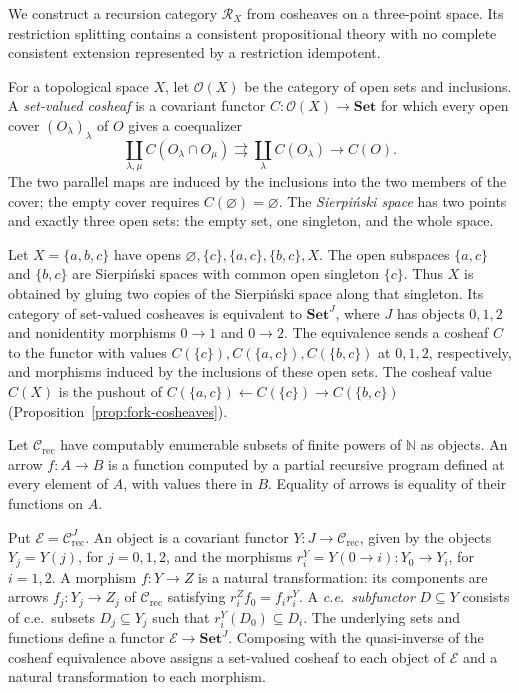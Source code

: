 \documentclass[11pt]{article}
\newcommand{\N}{\mathbb N}
\begin{document}
We construct a recursion category $\mathscr R_X$ from cosheaves on a
three-point space. Its restriction splitting contains a consistent
propositional theory with no complete consistent extension represented
by a restriction idempotent.

For a topological space $X$, let $\mathcal O(X)$ be the category
of open sets and inclusions. A \emph{set-valued cosheaf} is a
covariant functor $C:\mathcal O(X)\to\mathbf{Set}$ for which
every open cover $(O_\lambda)_\lambda$ of $O$ gives a coequalizer
\cite[Definition 2.6]{CurryCosheaves}
\[
 \coprod_{\lambda,\mu} C(O_\lambda\cap O_\mu)
 \rightrightarrows \coprod_\lambda C(O_\lambda)
 \longrightarrow C(O).
\]
The two parallel maps are induced by the inclusions into the two
members of the cover; the empty cover requires
$C(\varnothing)=\varnothing$.
The \emph{Sierpi\'nski space} has two points and exactly three open
sets: the empty set, one singleton, and the whole space.

Let $X=\{a,b,c\}$ have opens
$\varnothing,\{c\},\{a,c\},\{b,c\},X$.
The open subspaces $\{a,c\}$ and $\{b,c\}$ are Sierpi\'nski spaces
with common open singleton $\{c\}$. Thus $X$ is obtained by gluing
two copies of the Sierpi\'nski space along that singleton.
Its category of set-valued cosheaves is equivalent to
$\mathbf{Set}^{J}$, where $J$ has objects $0,1,2$ and nonidentity
morphisms $0\to1$ and $0\to2$.
The equivalence sends a cosheaf $C$ to the functor with values
$C(\{c\}),C(\{a,c\}),C(\{b,c\})$ at $0,1,2$, respectively,
and morphisms induced by the inclusions of these open sets.
The cosheaf value $C(X)$ is the pushout of
$C(\{a,c\})\leftarrow C(\{c\})\to C(\{b,c\})$
(Proposition~\ref{prop:fork-cosheaves}).

Let $\mathcal C_{\mathrm{rec}}$ have computably enumerable subsets
of finite powers of $\N$ as objects. An arrow $f:A\to B$ is a
function computed by a partial recursive program defined at every
element of $A$, with values there in $B$. Equality of arrows is
equality of their functions on $A$.

Put $\mathcal E=\mathcal C_{\mathrm{rec}}^J$.
An object is a covariant functor $Y:J\to\mathcal C_{\mathrm{rec}}$,
given by the objects $Y_j=Y(j)$, for $j=0,1,2$, and the
morphisms $r_i^Y=Y(0\to i):Y_0\to Y_i$, for $i=1,2$.
A morphism $f:Y\to Z$ is a natural transformation: its components
are arrows $f_j:Y_j\to Z_j$ of $\mathcal C_{\mathrm{rec}}$ satisfying
$r_i^Zf_0=f_i r_i^Y$.
A \emph{c.e.\ subfunctor} $D\subseteq Y$ consists of c.e.\ subsets
$D_j\subseteq Y_j$ such that $r_i^Y(D_0)\subseteq D_i$.
The underlying sets and functions define a functor
$\mathcal E\to\mathbf{Set}^J$. Composing with the quasi-inverse of
the cosheaf equivalence above assigns a set-valued cosheaf to each
object of $\mathcal E$ and a natural transformation to each morphism.
\end{document}
